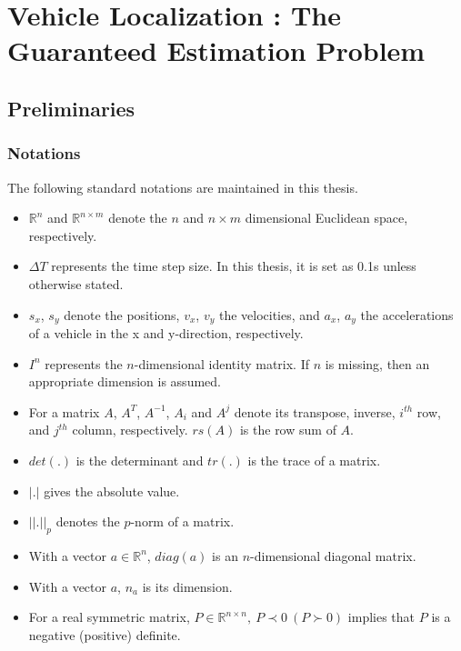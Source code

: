 \chapter{Vehicle Localization : The Guaranteed Estimation Problem} \label{ch:problem}
\section{Preliminaries}
\subsection{Notations}
The following standard notations are maintained in this thesis.
\begin{itemize}
\item{$\mathbb{R}^n$ and $\mathbb{R}^{n \times m}$ denote the $n$ and $n \times m$ dimensional Euclidean space, respectively.}
\item{$\Delta T$ represents the time step size. In this thesis, it is set as 0.1s unless otherwise stated.}
\item{$s_x$, $s_y$ denote the positions, $v_x$, $v_y$ the velocities, and $a_x$, $a_y$ the accelerations of a vehicle in the x and y-direction, respectively.}
\item{$I^n$ represents the $n$-dimensional identity matrix. If $n$ is missing, then an appropriate dimension is assumed.}
\item{For a matrix $A$, $A^T$, $A^{-1}$, $A_{i}$ and $A^{j}$ denote its transpose, inverse, $i^{th}$ row, and $j^{th}$ column, respectively. $rs(A)$ is the row sum of $A$.}
\item{ $det(.)$ is the determinant and $tr(.)$ is the trace of a matrix.}
\item{$|.|$ gives the absolute value.}
\item{$||.||_{p}$ denotes the $p$-norm of a matrix.}
\item{With a vector $a \in \mathbb{R}^n$, $diag(a)$ is an $n$-dimensional diagonal matrix.}
\item{With a vector $a$, $n_a$ is its dimension.}
\item{For a real symmetric matrix, $P \in \mathbb{R}^{n \times n},~P \prec 0~(P \succ 0)$ implies that $P$ is a negative (positive) definite.}
\end{itemize}
